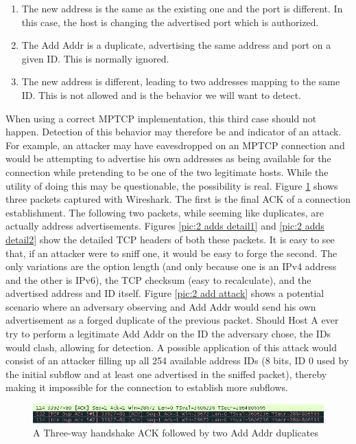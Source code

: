 \begin{enumerate}
\item The new address is the same as the existing one and the port is different. In this case, the host is changing the advertised port which is authorized.
\item The Add Addr is a duplicate, advertising the same address and port on a given ID. This is normally ignored.
\item The new address is different, leading to two addresses mapping to the same ID. This is not allowed and is the behavior we will want to detect.
\end{enumerate} 

When using a correct MPTCP implementation, this third case should not happen. Detection of this behavior may therefore be and indicator of an attack. For example, an attacker may have eavesdropped on an MPTCP connection and would be attempting to advertise his own addresses as being available for the connection while pretending to be one of the two legitimate hosts. While the utility of doing this may be questionable, the possibility is real. Figure \ref{pic:2 adds} shows three packets captured with Wireshark. The first is the final ACK of a connection establishment. The following two packets, while seeming like duplicates, are actually address advertisements. Figures \ref{pic:2 adds detail1} and \ref{pic:2 adds detail2} show the detailed TCP headers of both these packets. It is easy to see that, if an attacker were to sniff one, it would be easy to forge the second. The only variations are the option length (and only because one is an IPv4 address and the other is IPv6), the TCP checksum (easy to recalculate), and the advertised address and ID itself.  Figure \ref{pic:2 add attack} shows a potential scenario where an adversary observing and Add Addr would send his own advertisement as a forged duplicate of the previous packet. Should Host A ever try to perform a legitimate Add Addr on the ID the adversary chose, the IDs would clash, allowing for detection. A possible application of this attack  would consist of an attacker filling up all 254 available address IDs (8 bits, ID 0 used by the initial subflow and at least one advertised in the sniffed packet), thereby making it impossible for the connection to establish more subflows.\\

\begin{figure}[!t]
\centering
\includegraphics[scale = 0.6]{Figures/2addaddrwireshark.png}
\caption{A Three-way handshake ACK followed by two Add Addr duplicates}
\label{pic:2 adds}
\end{figure}

